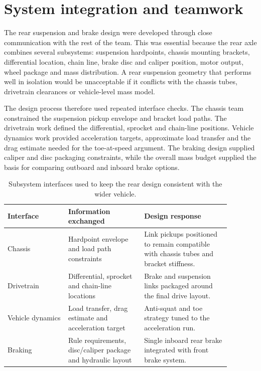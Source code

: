 \section{System integration and teamwork}

The rear suspension and brake design were developed through close communication with the rest of the team. This was essential because the rear axle combines several subsystems: suspension hardpoints, chassis mounting brackets, differential location, chain line, brake disc and caliper position, motor output, wheel package and mass distribution. A rear suspension geometry that performs well in isolation would be unacceptable if it conflicts with the chassis tubes, drivetrain clearances or vehicle-level mass model.

The design process therefore used repeated interface checks. The chassis team constrained the suspension pickup envelope and bracket load paths. The drivetrain work defined the differential, sprocket and chain-line positions. Vehicle dynamics work provided acceleration targets, approximate load transfer and the drag estimate needed for the toe-at-speed argument. The braking design supplied caliper and disc packaging constraints, while the overall mass budget supplied the basis for comparing outboard and inboard brake options.

\begin{table}[H]
\caption{Subsystem interfaces used to keep the rear design consistent with the wider vehicle.}
\label{tab:interfaces}
\centering
\begin{tabular}{p{0.24\linewidth}p{0.30\linewidth}p{0.34\linewidth}}
\toprule
Interface & Information exchanged & Design response \\
\midrule
Chassis & Hardpoint envelope and load path constraints & Link pickups positioned to remain compatible with chassis tubes and bracket stiffness. \\
Drivetrain & Differential, sprocket and chain-line locations & Brake and suspension links packaged around the final drive layout. \\
Vehicle dynamics & Load transfer, drag estimate and acceleration target & Anti-squat and toe strategy tuned to the acceleration run. \\
Braking & Rule requirements, disc/caliper package and hydraulic layout & Single inboard rear brake integrated with front brake system. \\
\bottomrule
\end{tabular}
\end{table}

